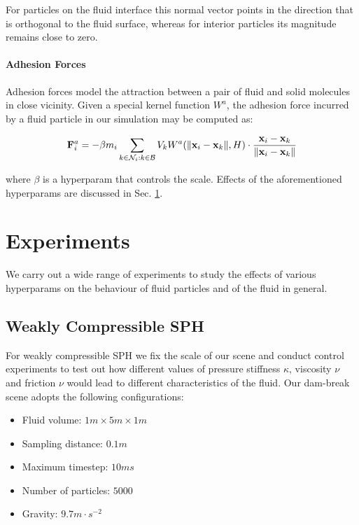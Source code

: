 \documentclass[
	11pt, 
	DIV10,
	ngerman,
	a4paper, 
	oneside, 
	headings=normal, 
	captions=tableheading,
	final, 
	numbers=noenddot
]{scrartcl}
\DeclarePairedDelimiter{\norm}{\lVert}{\rVert}
\begin{document}
For particles on the fluid interface this normal vector points in the direction that is orthogonal to the fluid surface, whereas for interior particles its magnitude remains close to zero.

\paragraph{Adhesion Forces}

Adhesion forces model the attraction between a pair of fluid and solid molecules in close vicinity. Given a special kernel function $ W^{a} $, the adhesion force incurred by a fluid particle in our simulation may be computed as:

\begin{equation}
	\label{28}
	\mathbf{F}_{i}^{a} = - \beta m_{i} \sum_{k \in \mathcal{N}_{i}:k \in \mathcal{B}} V_{k} W^{a}(\norm{\mathbf{x}_{i} - \mathbf{x}_{k}}, H) \cdot \frac{\mathbf{x}_{i} - \mathbf{x}_{k}}{\norm{\mathbf{x}_{i} - \mathbf{x}_{k}}}
\end{equation}

where $ \beta $ is a hyperparam that controls the scale. Effects of the aforementioned hyperparams are discussed in Sec. \ref{sec4}.

\section{Experiments}
\label{sec4}

We carry out a wide range of experiments to study the effects of various hyperparams on the behaviour of fluid particles and of the fluid in general.

\subsection{Weakly Compressible SPH}

For weakly compressible SPH we fix the scale of our scene and conduct control experiments to test out how different values of pressure stiffness $ \kappa $, viscosity $ \nu $ and friction $ \nu$ would lead to different characteristics of the fluid. Our dam-break scene adopts the following configurations:

\begin{itemize}
    \item Fluid volume: $ 1m \times 5m \times 1m $
    \item Sampling distance: $ 0.1m $
    \item Maximum timestep: $ 10ms $
    \item Number of particles: $ 5000 $
    \item Gravity: $ 9.7m \cdot s^{-2} $
\end{itemize}
\end{document}
